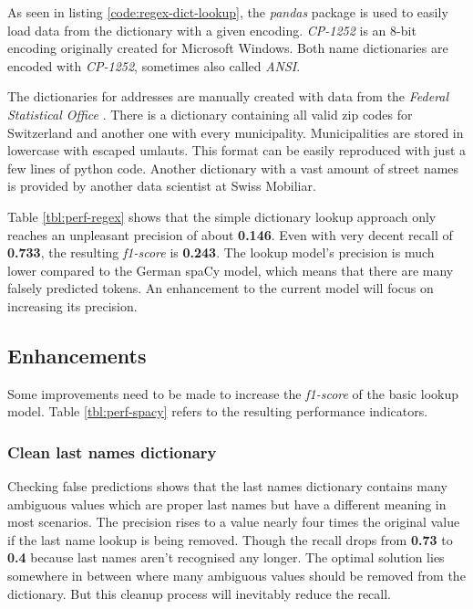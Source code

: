As seen in listing \ref{code:regex-dict-lookup}, the \emph{pandas} package is used to easily load data from the dictionary with a given encoding. \emph{CP-1252}
is an 8-bit encoding originally created for Microsoft Windows. Both name dictionaries are encoded with \emph{CP-1252}, sometimes also called \emph{ANSI}.

The dictionaries for addresses are manually created with data from the \emph{Federal Statistical Office} \cite{bfs}. There is a dictionary containing
all valid zip codes for Switzerland and another one with every municipality. Municipalities are stored in lowercase with escaped umlauts. This format
can be easily reproduced with just a few lines of python code. Another dictionary with a vast amount of street names is provided by another data scientist
at Swiss Mobiliar.

Table \ref{tbl:perf-regex} shows that the simple dictionary lookup approach only reaches an unpleasant precision of about \textbf{0.146}. Even with very
decent recall of \textbf{0.733}, the resulting \emph{f1-score} is \textbf{0.243}. The lookup model's precision is much lower compared to the German spaCy model,
which means that there are many falsely predicted tokens. An enhancement to the current model will focus on increasing its precision.

\subsection{Enhancements}

Some improvements need to be made to increase the \emph{f1-score} of the basic lookup model. Table \ref{tbl:perf-spacy} refers to the resulting performance indicators.

\subsubsection{Clean last names dictionary}

Checking false predictions shows that the last names dictionary contains many ambiguous values which are proper last names but have a different meaning in most scenarios.
The precision rises to a value nearly four times the original value if the last name lookup is being removed. Though the recall drops from \textbf{0.73} to \textbf{0.4}
because last names aren't recognised any longer. The optimal solution lies somewhere in between where many ambiguous values should be removed from the dictionary. But
this cleanup process will inevitably reduce the recall.

